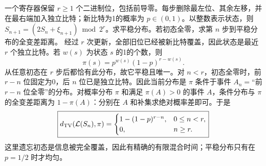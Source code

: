一个寄存器保留 $r\ge1$ 个二进制位，包括前导零。每步删除最左位、其余左移，并在最右端加入独立比特；新比特为1的概率为 $p\in(0,1)$。以整数表示状态，则 $S_{n+1}=(2S_n+\xi_{n+1})\bmod 2^r$。求平稳分布。若初态全零，求第 $n$ 步到平稳分布的全变差距离。
\solution 经过 $r$ 次更新，全部旧位已经被新比特覆盖，因此状态是最近 $r$ 个独立比特。若 $w(s)$ 为状态 $s$ 的1的个数，则
\[
 \boxed{\pi(s)=p^{w(s)}(1-p)^{r-w(s)}}.
\]
从任意初态在 $r$ 步后都恰有此分布，故它平稳且唯一。对 $n<r$，初态全零时，前 $r-n$ 位固定为0，后 $n$ 位已是独立比特。因此当前分布是 $\pi$ 条件于事件 $A_n=$“前 $r-n$ 位全零”的分布。对概率分布 $\pi$ 和满足 $\pi(A)>0$ 的事件 $A$，条件分布与 $\pi$ 的全变差距离为 $1-\pi(A)$：分别在 $A$ 和补集求绝对概率差即可。于是
\[
 \boxed{d_{\rm TV}(\mathcal L(S_n),\pi)=
 \begin{cases}1-(1-p)^{r-n},&0\le n<r,\\0,&n\ge r.\end{cases}}
\]
\insight 这里遗忘初态是信息被完全覆盖，因此有精确的有限混合时间；平稳分布只有在 $p=1/2$ 时才均匀。
